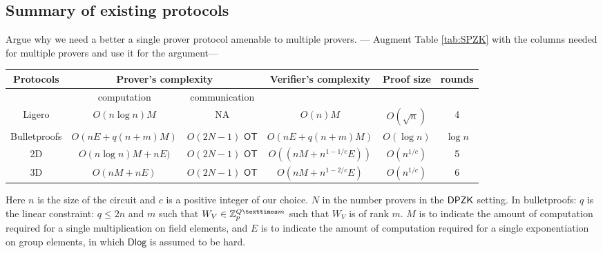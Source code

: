 \subsection{Summary of existing protocols}
Argue why we need a better a single prover protocol amenable to multiple provers. 
--- Augment Table \ref{tab:SPZK} with the columns needed for multiple provers and use it for the argument--- 
\begin{center}
	\begin{tabular}{ |c|c|c|c|c|c| } 
		\hline
		Protocols & \multicolumn{2}{c|}{Prover's complexity} & Verifier's complexity & Proof size & rounds \\
		\hline
		&computation & communication& & & \\ 
		\hline
		Ligero & $O(n\log n)M$ & NA &$O(n)M$ & $O(\sqrt{n})$ & 4\\
		\hline
		Bulletproofs & $O(nE+q(n+m)M)$ & $O(2N-1)$ $\mathsf{OT}$& $O(nE+q(n+m)M)$ & $O(\log n)$ & $\log n$  \\
		\hline
		\name2D & $O(n \log n) M + nE)$ & $O(2N-1)$ $\mathsf{OT}$ & $O((nM + n^{1-1/c}E))$ & $O(n^{1/c})$ & 5 \\
		\hline
		\name3D & $O(nM+nE)$ & $O(2N-1)$ $\mathsf{OT}$ & $O(nM+n^{1-2/c}E)$& $O(n^{1/c})$ & $6$\\
		\hline
	\end{tabular}
\end{center}
Here $n$ is the size of the circuit and $c$ is a positive integer of our choice. $N$ in the number provers in the $\mathsf{DPZK}$ setting. 
In bulletproofs: $q$ is the linear constraint: $q\leq 2n$ and $m$ such that $W_V \in \bbZ_p^{Q×m}$  such that $W_V$ is of rank $m$.
$M$ is to indicate the amount of computation required for a single multiplication on field elements, and $E$ is to indicate the amount of computation required for a single exponentiation on group elements, in which $\mathsf{Dlog}$ is assumed to be hard.
